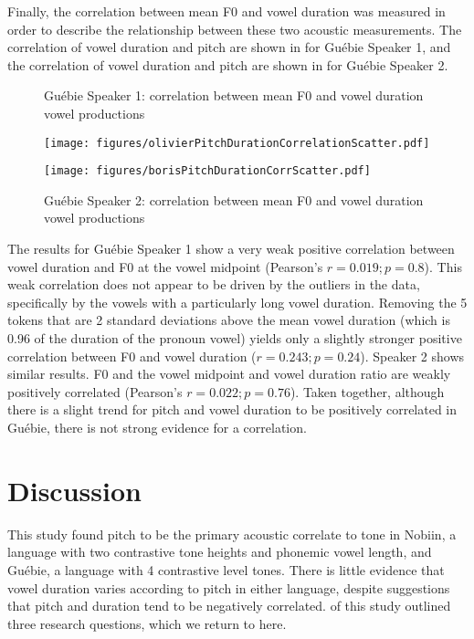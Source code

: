 \documentclass[output=paper]{langscibook}
\begin{document}
Finally, the correlation between mean F0 and vowel duration was measured in order to describe the relationship between these two acoustic measurements. The correlation of vowel duration and pitch are shown in  for Guébie Speaker 1, and the correlation of vowel duration and pitch are shown in  for Guébie Speaker 2.

\begin{figure}
\begin{floatrow}
 \captionsetup{margin=.05\linewidth}
 \ffigbox
 {\caption{Guébie Speaker 1: correlation between mean F0 and vowel duration vowel productions\label{fig:oakley:olivierPitchDurationCorrelation}}}
 {\texttt{[image: figures/olivierPitchDurationCorrelationScatter.pdf]}}%
 \ffigbox
 {\caption{Guébie Speaker 2: correlation between mean F0 and vowel duration vowel productions\label{fig:oakley:borisPitchDurationCorr}}}
 {\texttt{[image: figures/borisPitchDurationCorrScatter.pdf]}}
\end{floatrow}
\end{figure}
   
The results for Guébie Speaker 1 show a very weak positive correlation between vowel duration and F0 at the vowel midpoint (Pearson's $r=0.019; p=0.8$). This weak correlation does not appear to be driven by the outliers in the data, specifically by the vowels with a particularly long vowel duration. Removing the 5 tokens that are 2 standard deviations above the mean vowel duration (which is 0.96 of the duration of the pronoun vowel) yields only a slightly stronger positive correlation between F0 and vowel duration ($r=0.243; p=0.24$). Speaker 2 shows similar results. F0 and the vowel midpoint and vowel duration ratio are weakly positively correlated (Pearson's $r=0.022; p=0.76$). Taken together, although there is a slight trend for pitch and vowel duration to be positively correlated in Guébie, there is not strong evidence for a correlation.

\section{Discussion}\label{sec:oakley:4}
This study found pitch to be the primary acoustic correlate to tone in Nobiin, a language with two contrastive tone heights and phonemic vowel length, and Guébie, a language with 4 contrastive level tones. There is little evidence that vowel duration varies according to pitch in either language, despite suggestions that pitch and duration tend to be negatively correlated.  of this study outlined three research questions, which we return to here.
\end{document}
